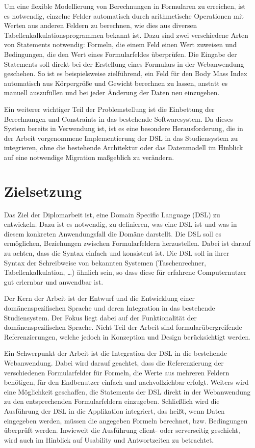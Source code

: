 Um eine flexible Modellierung von Berechnungen in Formularen zu erreichen, ist es notwendig, einzelne Felder
automatisch durch arithmetische Operationen mit Werten aus anderen Feldern zu berechnen, wie dies aus diversen
Tabellenkalkulationsprogrammen bekannt ist. Dazu sind zwei verschiedene Arten von Statements notwendig:
Formeln, die einem Feld einen Wert zuweisen und Bedingungen, die den Wert eines Formularfeldes
überprüfen. Die Eingabe der Statements soll direkt bei der Erstellung eines Formulars in der Webanwendung
geschehen. So ist es beispielsweise zielführend, ein Feld für den Body Mass Index automatisch aus
Körpergröße und Gewicht berechnen zu lassen, anstatt es manuell auszufüllen und bei jeder Änderung der
Daten neu einzugeben.

Ein weiterer wichtiger Teil der Problemstellung ist die Einbettung der Berechnungen und Constraints in das
bestehende Softwaresystem. Da dieses System bereits in Verwendung ist, ist es eine besondere
Herausforderung, die in der Arbeit vorgenommene Implementierung der DSL in das Studiensystem zu integrieren,
ohne die bestehende Architektur oder das Datenmodell im Hinblick auf eine notwendige Migration
maßgeblich zu verändern.


\section{Zielsetzung}

Das Ziel der Diplomarbeit ist, eine Domain Specific Language (DSL) zu entwickeln. Dazu ist es notwendig, zu definieren, was eine DSL
ist und was in diesem konkreten Anwendungsfall die Domäne darstellt. Die DSL soll es ermöglichen,
Beziehungen zwischen Formularfeldern herzustellen. Dabei ist darauf zu achten, dass die Syntax einfach
und konsistent ist. Die DSL soll in ihrer Syntax der Schreibweise von bekannten Systemen (Taschenrechner,
Tabellenkalkulation, …) ähnlich sein, so dass diese für erfahrene Computernutzer gut erlernbar und
anwendbar ist.

Der Kern der Arbeit ist der Entwurf und die Entwicklung einer do\-mä\-nen\-spe\-zi\-fi\-schen Sprache und deren
Integration in das bestehende Studiensystem. Der Fokus liegt dabei auf der Funktionalität der
domänenspezifischen Sprache. Nicht Teil der Arbeit sind formularübergreifende Referenzierungen, welche
jedoch in Konzeption und Design berücksichtigt werden. 

Ein Schwerpunkt der Arbeit ist die Integration der DSL in die bestehende Webanwendung. Dabei wird darauf
geachtet, dass die Referenzierung der verschiedenen Formularfelder für Formeln, die Werte aus
mehreren Feldern benötigen, für den Endbenutzer einfach und nachvollziehbar erfolgt. Weiters wird eine
Möglichkeit geschaffen, die Statements der DSL direkt in der Webanwendung zu den
entsprechenden Formularfeldern einzugeben. Schließlich wird die Ausführung der DSL in die Applikation
integriert, das heißt, wenn Daten eingegeben werden, müssen die angegeben Formeln berechnet, bzw.
Bedingungen überprüft werden. Inwieweit die Ausführung client- oder serverseitig geschieht, wird auch im
Hinblick auf Usability und Antwortzeiten zu betrachtet.




